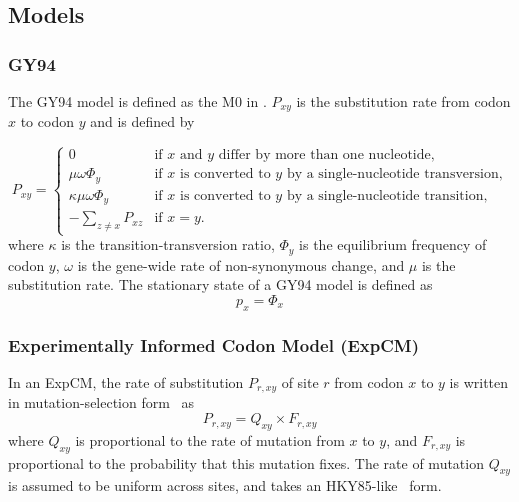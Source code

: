 \documentclass[11pt]{article}
\begin{document}
\subsection*{Models}

\subsubsection*{GY94}

The GY94 model is defined as the M0 in \cite{yang2000codon}. 
$P_{xy}$ is the substitution rate from codon $x$ to codon $y$ and is defined by

\begin{equation}
\label{eq:GY94}
P_{xy} = 
\begin{cases}
  0 & \mbox{if $x$ and $y$ differ by more than one nucleotide,}\\
  \mu \omega \Phi_{y} & \mbox{if $x$ is converted to $y$ by a single-nucleotide transversion,} \\
  \kappa \mu \omega \Phi_{y} & \mbox{if $x$ is converted to $y$ by a single-nucleotide transition,} \\
  -\sum\limits_{z \ne x} P_{xz} & \mbox{if $x = y$.}
  \end{cases}
\end{equation}
where $\kappa$ is the transition-transversion ratio, $\Phi_y$ is the equilibrium frequency of
codon $y$, $\omega$ is the gene-wide rate of non-synonymous change, and $\mu$ is the substitution rate.
The stationary state of a GY94 model is defined as 
\begin{equation}
\label{eq:px}
p_{x} = \Phi_x
\end{equation}

\subsubsection*{Experimentally Informed Codon Model (ExpCM)}

In an ExpCM, the rate of substitution $P_{r,xy}$ of site $r$ from codon $x$ to $y$ is written in mutation-selection form~\citep{halpern1998evolutionary,mccandlish2014modeling,spielman2015relationship} as
\begin{equation}
\label{eq:ExpCM}
P_{r,xy} = Q_{xy} \times F_{r,xy}
\end{equation}
where $Q_{xy}$ is proportional to the rate of mutation from $x$ to $y$, and $F_{r,xy}$ is proportional to the probability that this mutation fixes.
The rate of mutation $Q_{xy}$ is assumed to be uniform across sites, and takes an HKY85-like~\citep{hasegawa1985dating} form.
\end{document}

